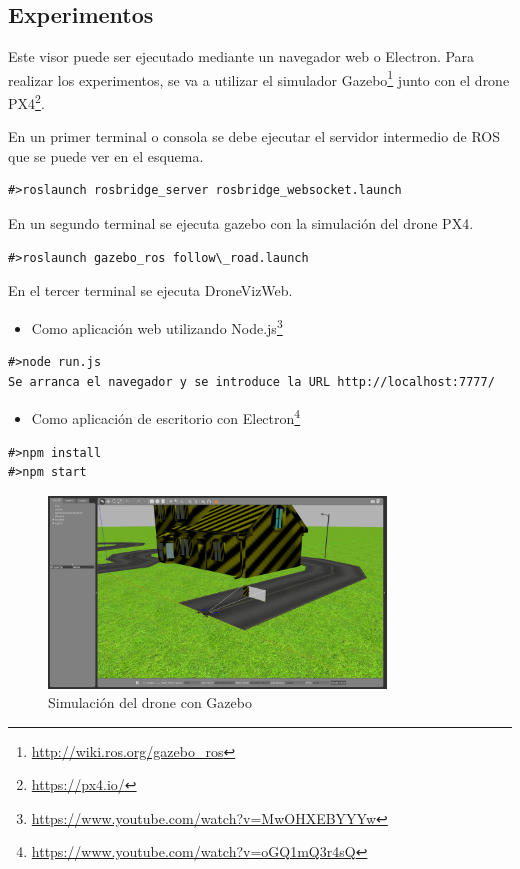 \subsection{Experimentos}
Este visor puede ser ejecutado mediante un navegador web o Electron. Para realizar los experimentos, se va a utilizar el simulador Gazebo\footnote{\url{http://wiki.ros.org/gazebo_ros}} junto con el drone PX4\footnote{\url{https://px4.io/}}.

En un primer terminal o consola se debe ejecutar el servidor intermedio de ROS que se puede ver en el esquema.
\begin{lstlisting}[caption= Ejecución del servidor intermedio, label=cod.servidorintermediodrone]
#>roslaunch rosbridge_server rosbridge_websocket.launch
\end{lstlisting}

En un segundo terminal se ejecuta gazebo con la simulación del drone PX4.

\begin{lstlisting}[caption= Ejecución de gazebo con el drone PX4 label=cod.gazebodrone]
#>roslaunch gazebo_ros follow\_road.launch
\end{lstlisting}

En el tercer terminal se ejecuta DroneVizWeb.

\begin{itemize}
\item Como aplicación web utilizando Node.js\footnote{\url{https://www.youtube.com/watch?v=MwOHXEBYYYw}}
\end{itemize}
\begin{lstlisting}[caption= Ejecución con Node.js, label=cod.dronenodejs]
#>node run.js
Se arranca el navegador y se introduce la URL http://localhost:7777/
\end{lstlisting}
\begin{itemize}
\item Como aplicación de escritorio con Electron\footnote{\url{https://www.youtube.com/watch?v=oGQ1mQ3r4sQ}}
\end{itemize}
\begin{lstlisting}[caption= Ejecución con Electron, label=cod.droneelectron]
#>npm install
#>npm start
\end{lstlisting}

\begin{figure}[H]
  \begin{center}
    \includegraphics[width=0.8\textwidth]{figures/gazebodrone.png}
    		\caption{Simulación del drone con Gazebo}
		\label{fig.testcamserver1}
		\end{center}
\end{figure}

